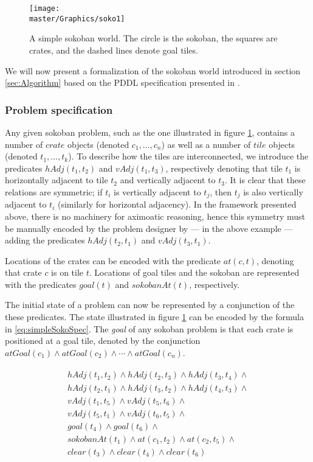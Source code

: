 \documentclass[../Master.tex]{subfiles}
\begin{document}
\begin{figure}
    \centering
    \texttt{[image: \\master/Graphics/soko1]}
    \caption{\label{fig:simpleSokoban} A simple sokoban world. The circle is the sokoban, the squares are crates, and the dashed lines denote goal tiles.}
\end{figure}

We will now present a formalization of the sokoban world introduced in section \ref{sec:Algorithm} based on the PDDL specification presented in \cite{BS2011}.

\subsubsection*{Problem specification}
Any given sokoban problem, such as the one illustrated in figure \ref{fig:simpleSokoban}, contains a number of $crate$ objects (denoted $c_1, \dots, c_n$) as well as a number of $tile$ objects (denoted $t_1, \dots, t_k$). To describe how the tiles are interconnected, we introduce the predicates $hAdj(t_1,t_2)$ and $vAdj(t_1,t_3)$, respectively denoting that tile $t_1$ is horizontally adjacent to tile $t_2$ and vertically adjacent to $t_3$. It is clear that these relations are symmetric; if $t_i$ is vertically adjacent to $t_j$, then $t_j$ is also vertically adjacent to $t_i$ (similarly for horizontal adjacency). In the framework presented above, there is no machinery for aximoatic reasoning, hence this symmetry must be manually encoded by the problem designer by --- in the above example --- adding the predicates $hAdj(t_2,t_1)$ and $vAdj(t_3,t_1)$.

Locations of the crates can be encoded with the predicate $at(c, t)$, denoting that crate $c$ is on tile $t$. Locations of goal tiles and the sokoban are represented with the predicates $goal(t)$ and $sokobanAt(t)$, respectively.

The initial state of a problem can now be represented by a conjunction of the these predicates. The state illustrated in figure \ref{fig:simpleSokoban} can be encoded by the formula in \eqref{eq:simpleSokoSpec}. The \textit{goal} of any sokoban problem is that each crate is positioned at a goal tile, denoted by the conjunction $atGoal(c_1) \land atGoal(c_2) \land \cdots \land atGoal(c_n)$.

\begin{gather}
\begin{gathered} \label{eq:simpleSokoSpec}
    hAdj(t_1, t_2) \land hAdj(t_2, t_3) \land hAdj(t_3, t_4) \land \\
    hAdj(t_2, t_1) \land hAdj(t_3, t_2) \land hAdj(t_4, t_3) \land \\
    vAdj(t_1, t_5) \land vAdj(t_5, t_6) \land \\
    vAdj(t_5, t_1) \land vAdj(t_6, t_5) \land \\
    goal(t_4) \land goal(t_6) \land \\
    sokobanAt(t_1) \land at(c_1, t_2) \land at(c_2, t_5) \land \\
    clear(t_3) \land clear(t_4) \land clear(t_6)
\end{gathered}
\end{gather}
\end{document}
